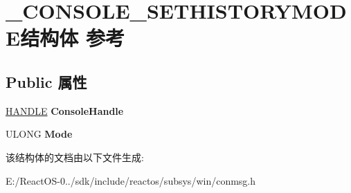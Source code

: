 \hypertarget{struct___c_o_n_s_o_l_e___s_e_t_h_i_s_t_o_r_y_m_o_d_e}{}\section{\+\_\+\+C\+O\+N\+S\+O\+L\+E\+\_\+\+S\+E\+T\+H\+I\+S\+T\+O\+R\+Y\+M\+O\+D\+E结构体 参考}
\label{struct___c_o_n_s_o_l_e___s_e_t_h_i_s_t_o_r_y_m_o_d_e}
\subsection*{Public 属性}
\begin{DoxyCompactItemize}
\item 
\mbox{\label{struct___c_o_n_s_o_l_e___s_e_t_h_i_s_t_o_r_y_m_o_d_e_af862a08abfb69c6618a3dab7a7415657}} 
\hyperlink{interfacevoid}{H\+A\+N\+D\+LE} {\bfseries Console\+Handle}
\item 
\mbox{\label{struct___c_o_n_s_o_l_e___s_e_t_h_i_s_t_o_r_y_m_o_d_e_acab3e2409530dffcfa7848d683d6ea37}} 
U\+L\+O\+NG {\bfseries Mode}
\end{DoxyCompactItemize}


该结构体的文档由以下文件生成\+:\begin{DoxyCompactItemize}
\item 
E\+:/\+React\+O\+S-\/0../sdk/include/reactos/subsys/win/conmsg.\+h\end{DoxyCompactItemize}

